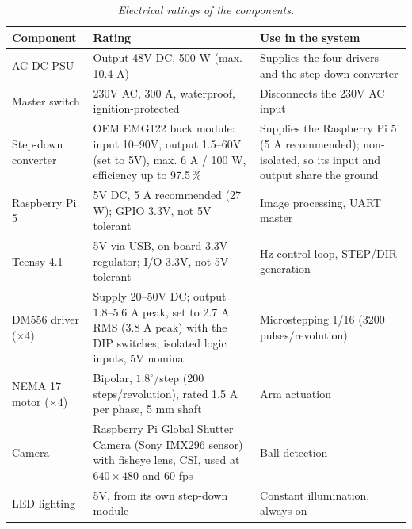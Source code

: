 \documentclass[12pt,a4paper]{report}
\begin{document}
\begin{table}[H]
\centering
\begin{tabularx}{\textwidth}{|l|>{\raggedright\arraybackslash}X|>{\raggedright\arraybackslash}X|}
\hline
\textbf{Component} & \textbf{Rating} & \textbf{Use in the system} \\ \hline
AC-DC PSU & Output 48V DC, 500 W (max. 10.4 A) & Supplies the four drivers and the step-down converter \\ \hline
Master switch & 230V AC, 300 A, waterproof, ignition-protected & Disconnects the 230V AC input \\ \hline
Step-down converter & OEM EMG122 buck module: input 10--90V, output 1.5--60V (set to 5V), max. 6 A / 100 W, efficiency up to 97.5\,\% & Supplies the Raspberry Pi 5 (5 A recommended); non-isolated, so its input and output share the ground \\ \hline
Raspberry Pi 5 & 5V DC, 5 A recommended (27 W); GPIO 3.3V, not 5V tolerant & Image processing, UART master \\ \hline
Teensy 4.1 & 5V via USB, on-board 3.3V regulator; I/O 3.3V, not 5V tolerant & 200 Hz control loop, STEP/DIR generation \\ \hline
DM556 driver ($\times 4$) & Supply 20--50V DC; output 1.8--5.6 A peak, set to 2.7 A RMS (3.8 A peak) with the DIP switches; isolated logic inputs, 5V nominal & Microstepping 1/16 (3200 pulses/revolution) \\ \hline
NEMA 17 motor ($\times 4$) & Bipolar, $1.8^\circ$/step (200 steps/revolution), rated 1.5 A per phase, 5 mm shaft \cite{nema17} & Arm actuation \\ \hline
Camera & Raspberry Pi Global Shutter Camera (Sony IMX296 sensor) with fisheye lens, CSI, used at $640 \times 480$ and 60 fps & Ball detection \\ \hline
LED lighting & 5V, from its own step-down module & Constant illumination, always on \\ \hline
\end{tabularx}
\caption{\textit{Electrical ratings of the components.}}
\label{tab:ratings}
\end{table}
\end{document}
